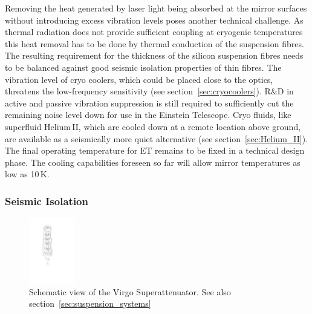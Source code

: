 Removing the heat generated by laser light being absorbed at the mirror surfaces 
without introducing excess vibration levels poses another technical challenge. As 
thermal radiation does not provide sufficient coupling at cryogenic temperatures 
this heat removal has to be done by thermal conduction of the suspension fibres. 
The resulting requirement for the thickness of the silicon suspension fibres needs 
to be balanced against good seismic isolation properties of thin fibres. The vibration 
level of cryo coolers, which could be placed close to the optics, threatens the 
low-frequency sensitivity (see section~\ref{sec:cryocoolers}). R\&D in active and 
passive vibration suppression is still required to sufficiently cut the remaining noise 
level down for use in the Einstein Telescope. Cryo fluids, like superfluid Helium\,II, 
which are cooled down at a remote location above ground, are available as a 
seismically more quiet alternative (see section~\ref{sec:Helium_II}). The final operating 
temperature for ET remains to be fixed in a technical design 
phase. The cooling capabilities foreseen so far will allow mirror temperatures 
as low as 10\,K.

\subsubsection{Seismic Isolation}

\begin{figure}
\vskip -0.4cm
	\centering
		\includegraphics[width=0.18\textwidth]{./Sec_Introduction/VirgoSA.pdf}
\vskip 0.3cm
	\caption{Schematic view of the Virgo Superattenuator. See also section~\ref{sec:suspension_systems}}
\vskip -0.6cm
\end{figure} 


